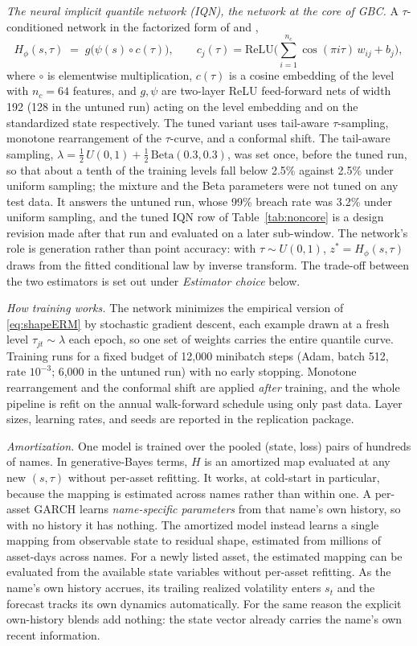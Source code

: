 \documentclass[11pt]{article}
\theoremstyle{remark}
\begin{document}
\emph{The neural implicit quantile network (IQN), the network at the core of GBC.} A
$\tau$-conditioned network
in the factorized form of \citet{dabney2018iqn} and
\citet{polson2023gbc},
\begin{equation}
H_\phi(s,\tau) \;=\; g\big(\psi(s)\circ c(\tau)\big),
\qquad
c_j(\tau) = \mathrm{ReLU}\Big(\textstyle\sum_{i=1}^{n_c}
\cos(\pi i \tau)\, w_{ij} + b_j\Big),
\label{eq:iqn}
\end{equation}
where $\circ$ is elementwise multiplication, $c(\tau)$ is a cosine embedding of the level with $n_c=64$ features, and $g,\psi$ are two-layer ReLU feed-forward nets of width 192 (128 in the untuned run) acting on the level embedding and on the standardized state respectively. The tuned variant uses tail-aware $\tau$-sampling, monotone rearrangement of the $\tau$-curve, and a conformal shift. The tail-aware sampling, $\lambda = \tfrac12\,U(0,1) + \tfrac12\,\mathrm{Beta}(0.3,0.3)$, was set once, before the tuned run, so that about a tenth of the training levels fall below 2.5\% against 2.5\% under uniform sampling; the mixture and the Beta parameters were not tuned on any test data. It answers the untuned run, whose 99\% breach rate was 3.2\% under uniform sampling, and the tuned IQN row of Table~\ref{tab:noncore} is a design revision made after that run and evaluated on a later sub-window. The network's role is generation rather than
point accuracy: with $\tau\sim U(0,1)$,
$z^{*} = H_\phi(s,\tau)$ draws from the fitted conditional law by
inverse transform. The trade-off between the two estimators is set out under \emph{Estimator choice} below.

\emph{How training works.} The network minimizes the empirical version
of \eqref{eq:shapeERM} by stochastic gradient descent, each example
drawn at a fresh level $\tau_{jt}\sim\lambda$ each epoch, so one set of
weights carries the entire quantile curve. Training runs for a fixed budget of 12{,}000 minibatch steps (Adam, batch 512, rate $10^{-3}$; 6{,}000 in the untuned run) with no early stopping. Monotone rearrangement and the conformal shift
are applied \emph{after} training, and the whole pipeline is refit on
the annual walk-forward schedule using only past data. Layer sizes,
learning rates, and seeds are reported in the replication package.

\emph{Amortization.} One model is trained over the pooled (state, loss)
pairs of hundreds of names. In generative-Bayes terms, $H$ is an
amortized map evaluated at any new $(s,\tau)$ without per-asset
refitting. It works, at cold-start in particular, because the mapping is estimated across names rather than within one. A per-asset
GARCH learns \emph{name-specific parameters} from that name's own
history, so with no history it has nothing. The amortized model instead
learns a single mapping from observable state to residual shape,
estimated from millions of asset-days across names. For a newly listed asset, the estimated mapping can be evaluated from the available state variables without per-asset refitting. As
the name's own history accrues, its trailing realized volatility enters
$s_t$ and the forecast tracks its own dynamics automatically. For the same reason the explicit own-history blends add nothing: the state vector already carries the name's own recent information.
\end{document}
